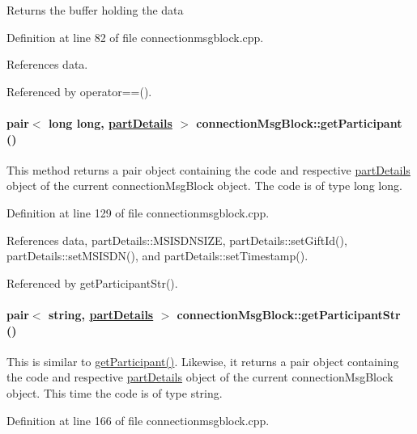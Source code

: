Returns the buffer holding the data 

Definition at line 82 of file connectionmsgblock.cpp.

References data.

Referenced by operator==().\hypertarget{classconnectionMsgBlock_connectionMsgBlocka7}{
\paragraph[getParticipant]{\setlength{\rightskip}{0pt plus 5cm}pair$<$ long long, \hyperlink{classpartDetails}{part\-Details} $>$ connection\-Msg\-Block::get\-Participant ()}\hfill}
\label{classconnectionMsgBlock_connectionMsgBlocka7}


This method returns a pair object containing the code and respective \hyperlink{classpartDetails}{part\-Details} object of the current connection\-Msg\-Block object. The code is of type long long. 

Definition at line 129 of file connectionmsgblock.cpp.

References data, part\-Details::MSISDNSIZE, part\-Details::set\-Gift\-Id(), part\-Details::set\-MSISDN(), and part\-Details::set\-Timestamp().

Referenced by get\-Participant\-Str().\hypertarget{classconnectionMsgBlock_connectionMsgBlocka8}{
\paragraph[getParticipantStr]{\setlength{\rightskip}{0pt plus 5cm}pair$<$ string, \hyperlink{classpartDetails}{part\-Details} $>$ connection\-Msg\-Block::get\-Participant\-Str ()}\hfill}
\label{classconnectionMsgBlock_connectionMsgBlocka8}


This is similar to \hyperlink{classconnectionMsgBlock_connectionMsgBlocka7}{get\-Participant()}. Likewise, it returns a pair object containing the code and respective \hyperlink{classpartDetails}{part\-Details} object of the current connection\-Msg\-Block object. This time the code is of type string. 

Definition at line 166 of file connectionmsgblock.cpp.

